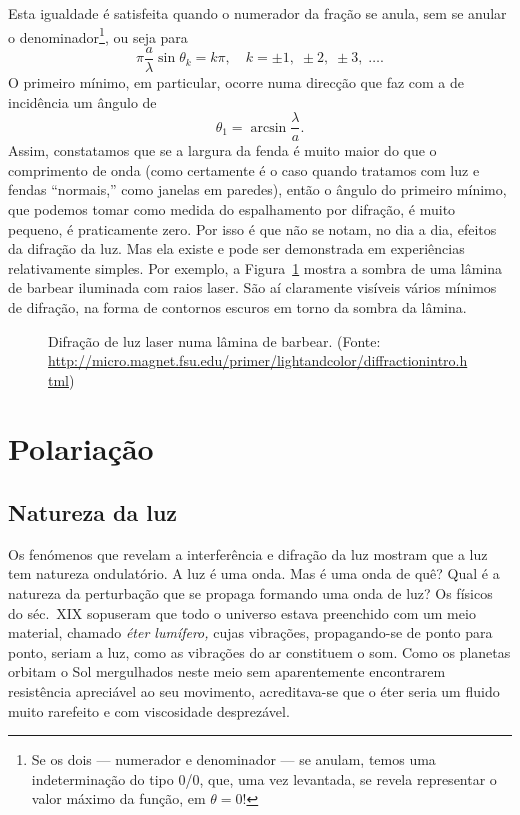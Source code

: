 Esta igualdade é satisfeita quando o numerador da fração se anula, sem se anular
o denominador\footnote{Se os dois --- numerador e denominador --- se anulam,
temos uma indeterminação do tipo 0/0, que, uma vez levantada, se revela
representar o valor máximo da função, em $\theta=0$!}, ou seja para
\begin{equation*}
    \pi \frac a \lambda\sin\theta_k=k\pi,\quad k=\pm1,\;\pm2,\;\pm3,\;\ldots.
\end{equation*}
O primeiro mínimo, em particular, ocorre numa direcção que faz com a de
incidência um ângulo de 
\begin{equation*}
    \theta_1 = \arcsin\frac{\lambda}{a}.
\end{equation*}
Assim, constatamos que se a largura da fenda é muito maior do que o comprimento
de onda (como certamente é o caso quando tratamos com luz e fendas ``normais,''
como janelas em paredes), então o ângulo do primeiro mínimo, que podemos tomar
como medida do espalhamento por difração, é muito pequeno, é praticamente zero.
Por isso é que não se notam, no dia a dia, efeitos da difração da luz. Mas ela
existe e pode ser demonstrada em experiências relativamente simples. Por
exemplo, a Figura~\ref{fig:oof130} mostra a sombra de uma lâmina de barbear
iluminada com raios laser. São aí claramente visíveis vários mínimos de
difração, na forma de contornos escuros em torno da sombra da lâmina.
\begin{figure}[htb]
    \begin{center}
    \end{center}
    \caption{Difração de luz laser numa lâmina de barbear. (Fonte:
        \protect%
        \url{http://micro.magnet.fsu.edu/primer/lightandcolor/diffractionintro.html})%
    \label{fig:oof130}}
\end{figure}

\section{Polariação}
\subsection{Natureza da luz}
Os fenómenos que revelam a interferência e difração da luz mostram que a luz tem
natureza ondulatório. A luz é uma onda. Mas é uma onda de quê? Qual é a natureza
da perturbação que se propaga formando uma onda de luz? Os físicos do séc.~XIX
sopuseram que todo o universo estava preenchido com um meio material, chamado
\emph{éter lumífero,} cujas vibrações, propagando-se de ponto para ponto, seriam
a luz, como as vibrações do ar constituem o som. Como os planetas orbitam o Sol
mergulhados neste meio sem aparentemente encontrarem resistência apreciável ao
seu movimento, acreditava-se que o éter seria um fluido muito rarefeito e com
viscosidade desprezável.

